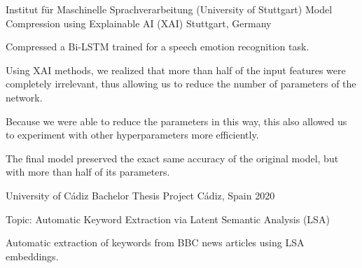 

\begin{cventries}

  \cventry
    {Institut für Maschinelle Sprachverarbeitung (University of Stuttgart)} %
    {Model Compression using Explainable AI (XAI)} %
    {Stuttgart, Germany} %
    {} %
    {
      \begin{cvitems} %
        \item {Compressed a Bi-LSTM trained for a speech emotion recognition task.}
		\item {Using XAI methods, we realized that more than half of the input features were completely irrelevant, thus allowing us to reduce the number of parameters of the network.}
		\item {Because we were able to reduce the parameters in this way, this also allowed us to experiment with other hyperparameters more efficiently.}
		\item {The final model preserved the exact same accuracy of the original model, but with more than half of its parameters.}
      \end{cvitems}
    }

  \cventry
    {University of Cádiz}
    {Bachelor Thesis Project}
    {Cádiz, Spain}
    {2020}
    {
      \begin{cvitems}
        \item Topic: Automatic Keyword Extraction via Latent Semantic Analysis (LSA)
        \item Automatic extraction of keywords from BBC news articles using LSA embeddings.
      \end{cvitems}
    }

\end{cventries}

